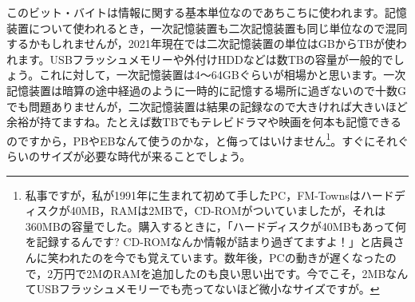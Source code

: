 \documentclass{ltjsbook}
\begin{document}
このビット・バイトは情報に関する基本単位なのであちこちに使われます。記憶装置について使われるとき，一次記憶装置も二次記憶装置も同じ単位なので混同するかもしれませんが，2021年現在では二次記憶装置の単位はGBからTBが使われます。USBフラッシュメモリーや外付けHDDなどは数TBの容量が一般的でしょう。これに対して，一次記憶装置は4〜64GBぐらいが相場かと思います。一次記憶装置は暗算の途中経過のように一時的に記憶する場所に過ぎないので十数Gでも問題ありませんが，二次記憶装置は結果の記録なので大きければ大きいほど余裕が持てますね。たとえば数TBでもテレビドラマや映画を何本も記憶できるのですから，PBやEBなんて使うのかな，と侮ってはいけません\footnote{私事ですが，私が1991年に生まれて初めて手したPC，FM-Townsはハードディスクが40MB，RAMは2MBで，CD-ROMがついていましたが，それは360MBの容量でした。購入するときに，「ハードディスクが40MBもあって何を記録するんです? CD-ROMなんか情報が詰まり過ぎてますよ！」と店員さんに笑われたのを今でも覚えています。数年後，PCの動きが遅くなったので，2万円で2MのRAMを追加したのも良い思い出です。今でこそ，2MBなんてUSBフラッシュメモリーでも売ってないほど微小なサイズですが。}。すぐにそれぐらいのサイズが必要な時代が来ることでしょう。
\end{document}
